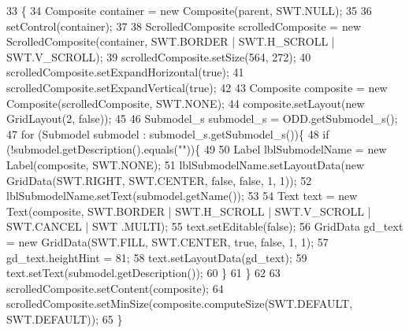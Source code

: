 \begin{DoxyCode}
33                                                 \{
34         Composite container = \textcolor{keyword}{new} Composite(parent, SWT.NULL);
35 
36         setControl(container);
37         
38         ScrolledComposite scrolledComposite = \textcolor{keyword}{new} ScrolledComposite(container, SWT.BORDER | SWT.H\_SCROLL | 
      SWT.V\_SCROLL);
39         scrolledComposite.setSize(564, 272);
40         scrolledComposite.setExpandHorizontal(\textcolor{keyword}{true});
41         scrolledComposite.setExpandVertical(\textcolor{keyword}{true});
42 
43         Composite composite = \textcolor{keyword}{new} Composite(scrolledComposite, SWT.NONE);
44         composite.setLayout(\textcolor{keyword}{new} GridLayout(2, \textcolor{keyword}{false}));
45         
46         Submodel\_s submodel\_s = ODD.getSubmodel\_s();
47         \textcolor{keywordflow}{for} (Submodel submodel : submodel\_s.getSubmodel\_s())\{
48             \textcolor{keywordflow}{if} (!submodel.getDescription().equals(\textcolor{stringliteral}{""}))\{
49                 
50                 Label lblSubmodelName = \textcolor{keyword}{new} Label(composite, SWT.NONE);
51                 lblSubmodelName.setLayoutData(\textcolor{keyword}{new} GridData(SWT.RIGHT, SWT.CENTER, \textcolor{keyword}{false}, \textcolor{keyword}{false}, 1, 1));
52                 lblSubmodelName.setText(submodel.getName());
53                 
54                 Text text = \textcolor{keyword}{new} Text(composite, SWT.BORDER | SWT.H\_SCROLL | SWT.V\_SCROLL | SWT.CANCEL | SWT
      .MULTI);
55                 text.setEditable(\textcolor{keyword}{false});
56                 GridData gd\_text = \textcolor{keyword}{new} GridData(SWT.FILL, SWT.CENTER, \textcolor{keyword}{true}, \textcolor{keyword}{false}, 1, 1);
57                 gd\_text.heightHint = 81;
58                 text.setLayoutData(gd\_text);
59                 text.setText(submodel.getDescription());
60             \}
61         \}
62         
63         scrolledComposite.setContent(composite);
64         scrolledComposite.setMinSize(composite.computeSize(SWT.DEFAULT, SWT.DEFAULT));
65     \}
\end{DoxyCode}
